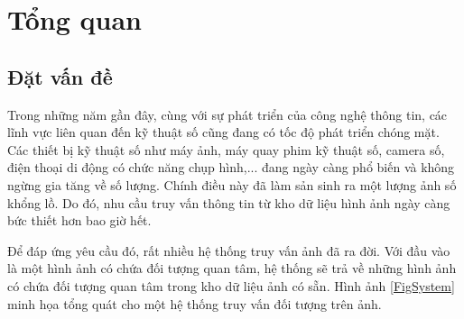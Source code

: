 
\chapter{Tổng quan}
\ifpdf
    \graphicspath{{Chapter1/Chapter1Figs/PNG/}{Chapter1/Chapter1Figs/PDF/}{Chapter1/Chapter1Figs/}}
\else
    \graphicspath{{Chapter1/Chapter1Figs/EPS/}{Chapter1/Chapter1Figs/}}
\fi
{}
\section{Đặt vấn đề}
Trong những năm gần đây, cùng với sự phát triển của công nghệ thông tin, các lĩnh vực liên quan đến kỹ thuật số cũng đang có tốc độ phát triển chóng mặt. Các thiết bị kỹ thuật số như máy ảnh, máy quay phim kỹ thuật số, camera số, điện thoại di động có chức năng chụp hình,... đang ngày càng phổ biến và không ngừng gia tăng về số lượng. Chính điều này đã làm sản sinh ra một lượng ảnh số khổng lồ. Do đó, nhu cầu truy vấn thông tin từ kho dữ liệu hình ảnh ngày càng bức thiết hơn bao giờ hết.

Để đáp ứng yêu cầu đó, rất nhiều hệ thống truy vấn ảnh đã ra đời. Với đầu vào là một hình ảnh có chứa đối tượng quan tâm, hệ thống sẽ trả về những hình ảnh có chứa đối tượng quan tâm trong kho dữ liệu ảnh có sẵn. Hình ảnh \ref{FigSystem} minh họa tổng quát cho một hệ thống truy vấn đối tượng trên ảnh.

